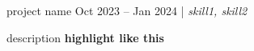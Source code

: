 \resumeSubheadings
{project name  }
{Oct 2023 -- Jan 2024}
{}{}{| \textit{skill1, skill2}}
\resumeItemListStart
\item description \textbf{highlight like this}
\resumeItemListEnd